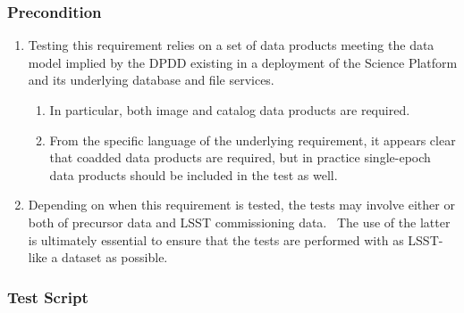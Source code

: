 \hypertarget{precondition-15}{%
\subsubsection{Precondition}\label{precondition-15}}

\begin{enumerate}
\tightlist
\item
  Testing this requirement relies on a set of data products meeting the
  data model implied by the DPDD existing in a deployment of the Science
  Platform and its underlying database and file services.

  \begin{enumerate}
  \tightlist
  \item
    In particular, both image and catalog data products are required.
  \item
    From the specific language of the underlying requirement, it appears
    clear that coadded data products are required, but in practice
    single-epoch data products should be included in the test as well.
  \end{enumerate}
\item
  Depending on when this requirement is tested, the tests may involve
  either or both of precursor data and LSST commissioning data. ~The use
  of the latter is ultimately essential to ensure that the tests are
  performed with as LSST-like a dataset as possible.
\end{enumerate}

\hypertarget{test-script-108}{%
\subsubsection{Test Script}\label{test-script-108}}

